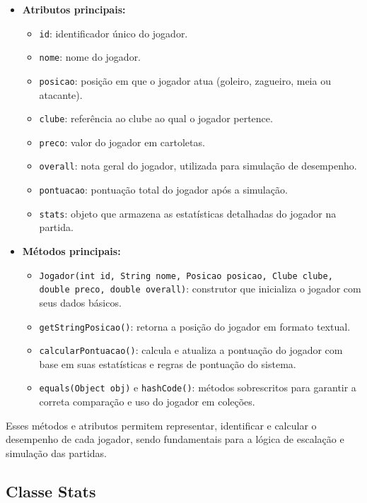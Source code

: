 \documentclass[12pt]{article}
\begin{document}
\begin{itemize}
  \item \textbf{Atributos principais:}
        \begin{itemize}
          \item \texttt{id}: identificador único do jogador.
          \item \texttt{nome}: nome do jogador.
          \item \texttt{posicao}: posição em que o jogador atua (goleiro, zagueiro, meia ou atacante).
          \item \texttt{clube}: referência ao clube ao qual o jogador pertence.
          \item \texttt{preco}: valor do jogador em cartoletas.
          \item \texttt{overall}: nota geral do jogador, utilizada para simulação de desempenho.
          \item \texttt{pontuacao}: pontuação total do jogador após a simulação.
          \item \texttt{stats}: objeto que armazena as estatísticas detalhadas do jogador na partida.
        \end{itemize}
  \item \textbf{Métodos principais:}
        \begin{itemize}
          \item \texttt{Jogador(int id, String nome, Posicao posicao, Clube clube, double preco, double overall)}: construtor que inicializa o jogador com seus dados básicos.
          \item \texttt{getStringPosicao()}: retorna a posição do jogador em formato textual.
          \item \texttt{calcularPontuacao()}: calcula e atualiza a pontuação do jogador com base em suas estatísticas e regras de pontuação do sistema.
          \item \texttt{equals(Object obj)} e \texttt{hashCode()}: métodos sobrescritos para garantir a correta comparação e uso do jogador em coleções.
        \end{itemize}
\end{itemize}

Esses métodos e atributos permitem representar, identificar e calcular o desempenho de cada jogador, sendo fundamentais para a lógica de escalação e simulação das partidas.

\subsection{Classe Stats}
\end{document}
